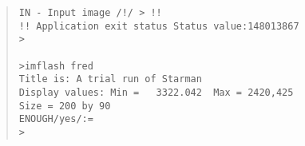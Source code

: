 {\begin{quote}
\begin{tabbing}
\verb#IN - Input image /!/ > !!                                                   # \\
\verb#!! Application exit status Status value:148013867                           # \\
\verb#>                                                            #\\
\verb#                                                             #\\
\verb#>imflash fred                                                               # \\
\verb#Title is: A trial run of Starman                                            # \\
\verb#Display values: Min =   3322.042  Max = 2420,425                           #\\
\verb#Size = 200 by 90                                                           #\\
\verb#ENOUGH/yes/:=                                                               # \\
\verb#>                                                            #\\
\end{tabbing}
\end{quote}
}

\newpage


